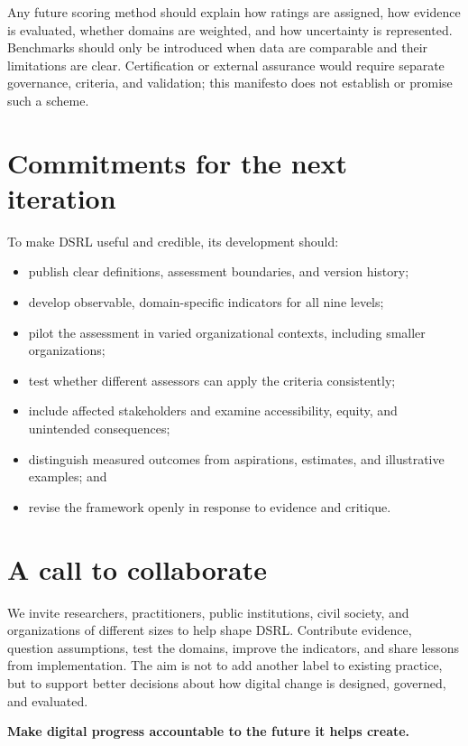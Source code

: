 \documentclass[11pt,a4paper]{article}
\begin{document}
Any future scoring method should explain how ratings are assigned, how evidence is evaluated, whether domains are weighted, and how uncertainty is represented. Benchmarks should only be introduced when data are comparable and their limitations are clear. Certification or external assurance would require separate governance, criteria, and validation; this manifesto does not establish or promise such a scheme.

\section*{Commitments for the next iteration}
To make DSRL useful and credible, its development should:
\begin{itemize}
  \item publish clear definitions, assessment boundaries, and version history;
  \item develop observable, domain-specific indicators for all nine levels;
  \item pilot the assessment in varied organizational contexts, including smaller organizations;
  \item test whether different assessors can apply the criteria consistently;
  \item include affected stakeholders and examine accessibility, equity, and unintended consequences;
  \item distinguish measured outcomes from aspirations, estimates, and illustrative examples; and
  \item revise the framework openly in response to evidence and critique.
\end{itemize}

\section*{A call to collaborate}
We invite researchers, practitioners, public institutions, civil society, and organizations of different sizes to help shape DSRL. Contribute evidence, question assumptions, test the domains, improve the indicators, and share lessons from implementation. The aim is not to add another label to existing practice, but to support better decisions about how digital change is designed, governed, and evaluated.

\begin{center}
\vspace{0.5em}
\Large\bfseries\color{dsrlgreen}Make digital progress accountable to the future it helps create.
\end{center}
\end{document}
